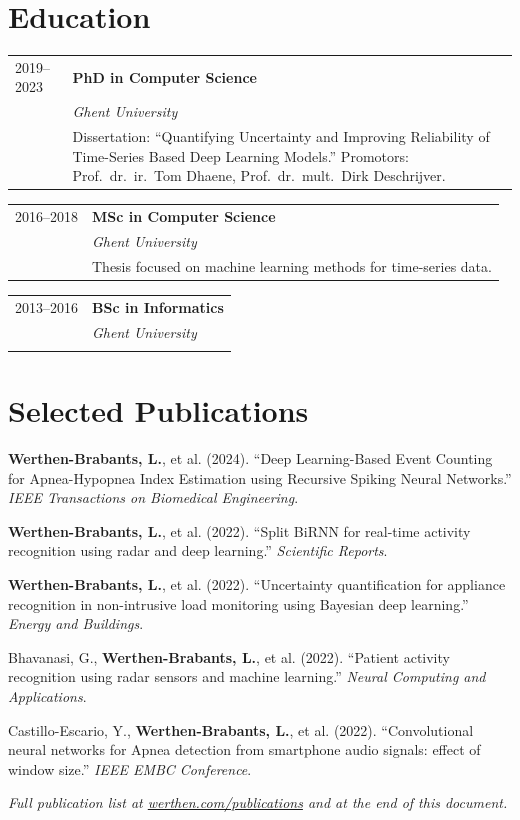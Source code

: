 \documentclass[10.5pt,a4paper]{article}
\makeatletter
\newenvironment{cvsection}[1]{%
  \vspace{1.8em}%
  \begin{minipage}[t]{\textwidth}
  \vspace{0pt}%
  \titlespacing{\section}{0pt}{0pt}{0.7em}%
  \section{#1}%
}{%
  \end{minipage}%
  \titlespacing{\section}{0pt}{1.8em}{0.7em}%
}
\newcommand{\cvitem}[4]{%
  \noindent
  \begin{tabularx}{\textwidth}{@{}p{2.1cm}X@{}}
    {\small\color{midgray}#1} & {\bfseries #2} \\
    & {\itshape\small #3} \\[2pt]
    & {\small #4}
  \end{tabularx}
  \vspace{0.9em}
}
\makeatother
\begin{document}
\begin{cvsection}{Education}

\cvitem{2019--2023}{PhD in Computer Science}{Ghent University}{Dissertation: ``Quantifying Uncertainty and Improving Reliability of Time-Series Based Deep Learning Models.'' Promotors: Prof.\ dr.\ ir.\ Tom Dhaene, Prof.\ dr.\ mult.\ Dirk Deschrijver.}

\cvitem{2016--2018}{MSc in Computer Science}{Ghent University}{Thesis focused on machine learning methods for time-series data.}

\cvitem{2013--2016}{BSc in Informatics}{Ghent University}{}

\end{cvsection}

\begin{cvsection}{Selected Publications}

\small
\begin{enumerate}[leftmargin=1.4em, itemsep=3pt, topsep=2pt, label={[\arabic*]}]
\item \textbf{Werthen-Brabants, L.}, et al. (2024). ``Deep Learning-Based Event Counting for Apnea-Hypopnea Index Estimation using Recursive Spiking Neural Networks.'' \textit{IEEE Transactions on Biomedical Engineering}.
\item \textbf{Werthen-Brabants, L.}, et al. (2022). ``Split BiRNN for real-time activity recognition using radar and deep learning.'' \textit{Scientific Reports}.
\item \textbf{Werthen-Brabants, L.}, et al. (2022). ``Uncertainty quantification for appliance recognition in non-intrusive load monitoring using Bayesian deep learning.'' \textit{Energy and Buildings}.
\item Bhavanasi, G., \textbf{Werthen-Brabants, L.}, et al. (2022). ``Patient activity recognition using radar sensors and machine learning.'' \textit{Neural Computing and Applications}.
\item Castillo-Escario, Y., \textbf{Werthen-Brabants, L.}, et al. (2022). ``Convolutional neural networks for Apnea detection from smartphone audio signals: effect of window size.'' \textit{IEEE EMBC Conference}.
\end{enumerate}

\textit{\small Full publication list at \href{https://www.werthen.com/publications/}{werthen.com/publications} and at the end of this document.}

\end{cvsection}
\end{document}
